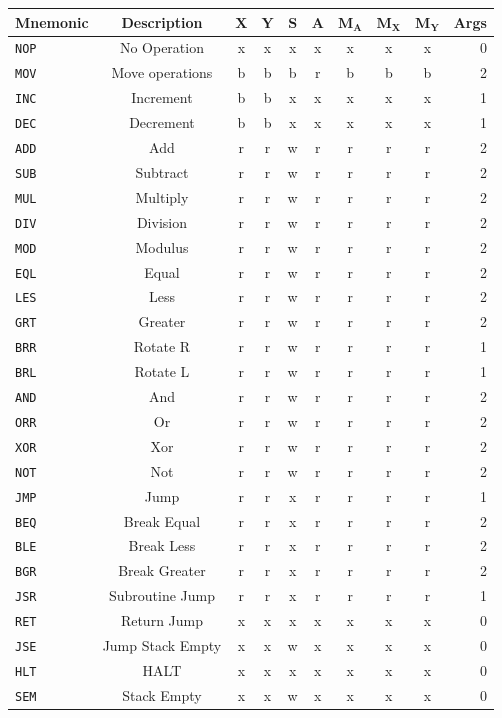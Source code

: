 \documentclass{article}
\newcommand{\x}{$\textbf{X}$}
\newcommand{\y}{$\textbf{Y}$}
\newcommand{\s}{$\textbf{S}$}
\newcommand{\A}{$\textbf{A}$}
\newcommand{\mx}{$\textbf{M}_{\textbf{X}}$}
\newcommand{\my}{$\textbf{M}_{\textbf{Y}}$}
\newcommand{\ma}{$\textbf{M}_{\textbf{A}}$}
\newcommand{\V}{\verb}
\begin{document}
\begin{tabular}{l || c | *{7}{c|} | r}
\textbf{Mnemonic} & \textbf{Description} & \x & \y& \s & \A &\ma & \mx & \my &
Args
\\
\hline
\V+NOP+ & No Operation & x & x & x & x & x & x & x & 0  \\
\hline
\V+MOV+ & Move operations & b & b & b & r & b & b & b & 2 \\
\hline
\V+INC+ & Increment& b & b & x & x & x & x & x & 1 \\
\V+DEC+ & Decrement	& b & b & x & x & x & x & x & 1 \\
\V+ADD+ & Add		& r & r & w & r & r & r & r & 2 \\
\V+SUB+ & Subtract	& r & r & w & r & r & r & r & 2 \\
\V+MUL+ & Multiply	& r & r & w & r & r & r & r & 2 \\
\V+DIV+ & Division	& r & r & w & r & r & r & r & 2 \\
\V+MOD+ & Modulus	& r & r & w & r & r & r & r & 2 \\
\hline
\V+EQL+ & Equal		& r & r & w & r & r & r & r & 2 \\
\V+LES+ & Less		& r & r & w & r & r & r & r & 2 \\
\V+GRT+ & Greater	& r & r & w & r & r & r & r & 2 \\
\V+BRR+ & Rotate R	& r & r & w & r & r & r & r & 1 \\
\V+BRL+ & Rotate L	& r & r & w & r & r & r & r & 1 \\
\V+AND+ & And		& r & r & w & r & r & r & r & 2 \\
\V+ORR+ & Or 		& r & r & w & r & r & r & r & 2 \\
\V+XOR+ & Xor		& r & r & w & r & r & r & r & 2 \\
\V+NOT+ & Not		& r & r & w & r & r & r & r & 2 \\
\hline
\V+JMP+ & Jump		& r & r & x & r & r & r & r & 1 \\
\V+BEQ+ & Break Equal& r & r & x & r & r & r & r & 2 \\
\V+BLE+ & Break Less	& r & r & x & r & r & r & r & 2 \\
\V+BGR+ & Break Greater& r & r & x & r & r & r & r & 2 \\
\V+JSR+ & Subroutine Jump& r & r & x & r & r & r & r & 1 \\
\V+RET+ & Return Jump& x & x & x & x & x & x & x & 0 \\
\V+JSE+ & Jump Stack Empty& x & x & w & x & x & x & x & 0 \\
\hline
\V+HLT+ & HALT& x & x & x & x & x & x & x & 0 \\
\V+SEM+ & Stack Empty& x & x & w & x & x & x & x & 0 \\
\end{tabular}
\end{document}
